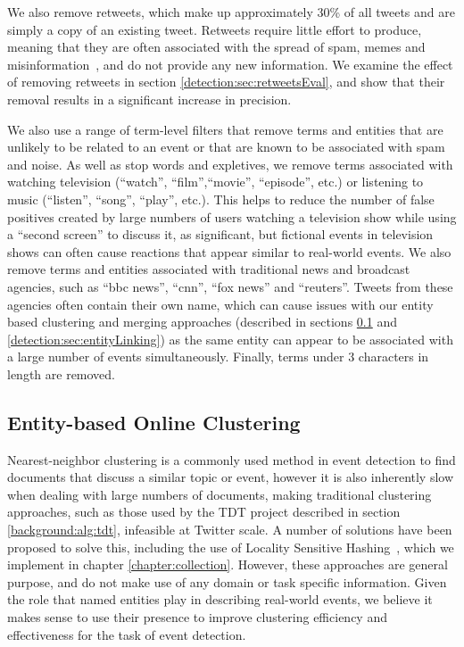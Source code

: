 We also remove retweets, which make up approximately 30\% of all tweets and are simply a copy of an existing tweet.
Retweets require little effort to produce, meaning that they are often associated with the spread of spam, memes and misinformation~\citep{Grier:2010:SUC:1866307.1866311}, and do not provide any new information.
We examine the effect of removing retweets in section \ref{detection:sec:retweetsEval}, and show that their removal results in a significant increase in precision.

We also use a range of term-level filters that remove terms and entities that are unlikely to be related to an event or that are known to be associated with spam and noise.
As well as stop words and expletives, we remove terms associated with watching television (``watch'', ``film'',``movie'', ``episode'', etc.) or listening to music (``listen'', ``song'', ``play'', etc.).
This helps to reduce the number of false positives created by large numbers of users watching a television show while using a ``second screen'' to discuss it, as significant, but fictional events in television shows can often cause reactions that appear similar to real-world events.
We also remove terms and entities associated with traditional news and broadcast agencies, such as ``bbc news'', ``cnn'', ``fox news'' and ``reuters''.
Tweets from these agencies often contain their own name, which can cause issues with our entity based clustering and merging approaches (described in sections \ref{detection:sec:clustering} and \ref{detection:sec:entityLinking}) as the same entity can appear to be associated with a large number of events simultaneously.
Finally, terms under 3 characters in length are removed.

\subsection{Entity-based Online Clustering}
\label{detection:sec:clustering}
Nearest-neighbor clustering is a commonly used method in event detection to find documents that discuss a similar topic or event, however it is also inherently slow when dealing with large numbers of documents, making traditional clustering approaches, such as those used by the TDT project described in section \ref{background:alg:tdt}, infeasible at Twitter scale.
A number of solutions have been proposed to solve this, including the use of Locality Sensitive Hashing~\citep{Petrovic10}, which we implement in chapter \ref{chapter:collection}.
However, these approaches are general purpose, and do not make use of any domain or task specific information.
Given the role that named entities play in describing real-world events, we believe it makes sense to use their presence to improve clustering efficiency and effectiveness for the task of event detection.

